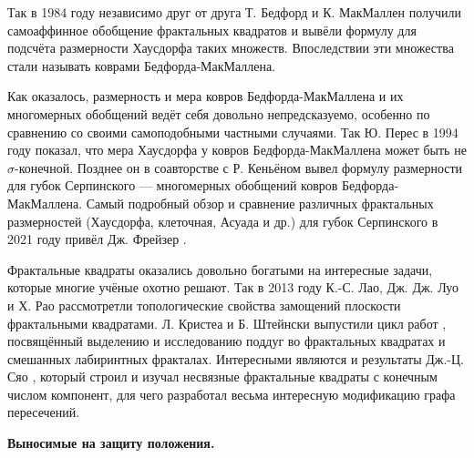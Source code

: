 Так в 1984 году независимо друг от друга Т. Бедфорд \cite{Bedford1984} и К. МакМаллен \cite{McMullen1984} получили самоаффинное обобщение фрактальных квадратов и вывёли формулу для подсчёта размерности Хаусдорфа таких множеств.
Впоследствии эти множества стали называть коврами Бедфорда-МакМаллена.

Как оказалось, размерность и мера ковров Бедфорда-МакМаллена и их многомерных обобщений ведёт себя довольно непредсказуемо, особенно по сравнению со своими самоподобными частными случаями.
Так Ю. Перес \cite{Peres1994} в 1994 году показал, что мера Хаусдорфа у ковров Бедфорда-МакМаллена может быть не $\sigma$-конечной.
Позднее он в соавторстве с Р. Кеньёном \cite{KenyonPeres1996} вывел формулу размерности для губок Серпинского --- многомерных обобщений ковров Бедфорда-МакМаллена.
Самый подробный обзор и сравнение различных фрактальных размерностей (Хаусдорфа, клеточная, Асуада и др.) для губок Серпинского в 2021 году привёл Дж. Фрейзер \cite{Fraser_2021}.

Фрактальные квадраты оказались довольно богатыми на интересные задачи, которые многие учёные охотно решают.
Так в 2013 году К.-С. Лао, Дж. Дж. Луо и Х. Рао \cite{LLR2013} рассмотретли топологические свойства замощений плоскости фрактальными квадратами.
Л. Кристеа и Б. Штейнски выпустили цикл работ \cite{CS1,CS2,CS3}, посвящённый выделению и исследованию поддуг во фрактальных квадратах и смешанных лабиринтных фракталах.
Интересными являются и результаты Дж.-Ц. Сяо \cite{Xiao2021}, который строил и изучал несвязные фрактальные квадраты с конечным числом компонент, для чего разработал весьма интересную модификацию графа пересечений.


\begin{center}
\textbf{Выносимые на защиту положения.}
\end{center}

